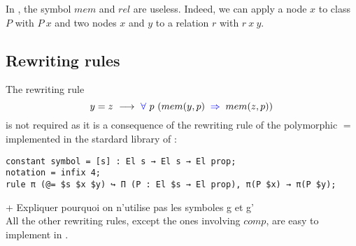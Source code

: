 \documentclass[a4paper]{article}
\begin{document}
In \dedukti, the symbol $mem$ and $rel$ are useless. Indeed, we can apply a node $x$ to class $P$ with $P~x$ and two nodes $x$ and $y$ to a relation $r$ with $r~x~y$.


\subsection{Rewriting rules}

The rewriting rule $$y = z \ \lra \ \fa \ p \ (mem(y, p) \ \imp \ mem(z, p))$$ is not required as it is a consequence of the rewriting rule of the polymorphic $=$ implemented in the stardard library of \dedukti: 
\begin{lstlisting}
constant symbol = [s] : El s → El s → El prop;
notation = infix 4;
rule π (@= $s $x $y) ↪ Π (P : El $s → El prop), π(P $x) → π(P $y);
\end{lstlisting}

+ Expliquer pourquoi on n'utilise pas les symboles g et g' \\

All the other rewriting rules, except the ones involving $comp$, are easy to implement in \dedukti.
\end{document}
